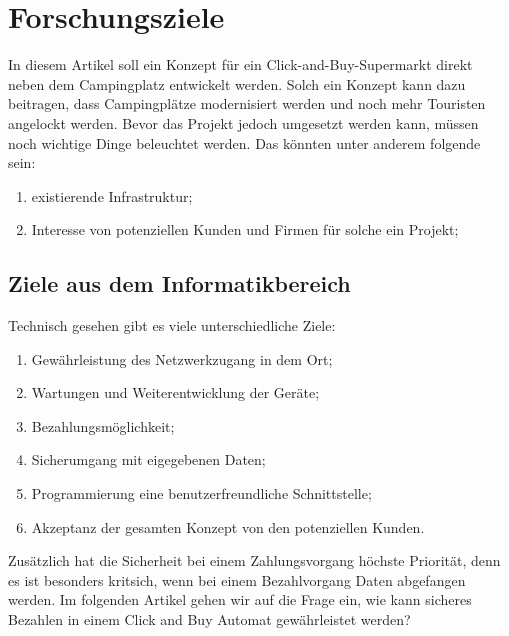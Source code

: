 \section{Forschungsziele}


In diesem Artikel soll ein Konzept für ein Click-and-Buy-Supermarkt direkt neben dem Campingplatz 
entwickelt werden. Solch ein Konzept kann dazu beitragen, dass Campingplätze modernisiert werden 
und noch mehr Touristen angelockt werden. Bevor das Projekt jedoch umgesetzt werden kann, müssen noch wichtige Dinge beleuchtet werden.
Das könnten unter anderem folgende sein:

\begin{enumerate}
    \item existierende Infrastruktur;
    \item Interesse von potenziellen Kunden und Firmen für solche ein Projekt;
\end{enumerate}


\subsection{Ziele aus dem Informatikbereich}

Technisch gesehen gibt es viele unterschiedliche Ziele:

\begin{enumerate}
    \item Gewährleistung des Netzwerkzugang in dem Ort;
    \item Wartungen und Weiterentwicklung der Geräte;
    \item Bezahlungsmöglichkeit;
    \item Sicherumgang mit eigegebenen Daten;
    \item Programmierung eine benutzerfreundliche Schnittstelle;
    \item Akzeptanz der gesamten Konzept von den potenziellen Kunden.
\end{enumerate}

Zusätzlich hat die Sicherheit bei einem Zahlungsvorgang höchste Priorität, denn es ist besonders kritsich, 
wenn bei einem Bezahlvorgang Daten abgefangen werden. 
Im folgenden Artikel gehen wir auf die Frage ein, wie kann sicheres Bezahlen in einem Click and Buy Automat gewährleistet werden?

%
%
%
%

